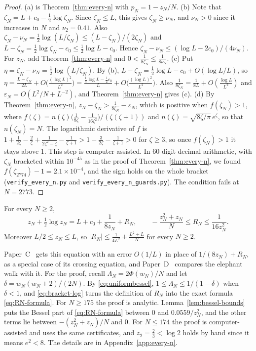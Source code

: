 \begin{proof}
(a) is Theorem~\ref{thm:every-n} with $p_N=1-z_N/N$. (b) Note that
$\zeta_N=L+c_0-\frac12\log\zeta_N$. Since $\zeta_N\le L$, this gives $\zeta_N\ge\nu_N$, and
$\nu_N>0$ since it increases in $N$ and $\nu_2=0.41$. Also $\zeta_N-\nu_N=\frac12\log(L/\zeta_N)\le(L-\zeta_N)/(2\zeta_N)$ and
$L-\zeta_N=\frac12\log\zeta_N-c_0\le\frac12\log L-c_0$. Hence
$\zeta_N-\nu_N\le(\log L-2c_0)/(4\nu_N)$. For $z_N$, add Theorem~\ref{thm:every-n} and
$0<\frac1{8\zeta_N}\le\frac1{8\nu_N}$. (c) Put $\eta=\zeta_N-\nu_N=\frac12\log(L/\zeta_N)$. By (b),
$L-\zeta_N=\frac12\log L-c_0+O(\log L/L)$, so
$\eta=\frac{L-\zeta_N}{2L}+O\bigl(\frac{(\log L)^2}{L^2}\bigr)
=\frac{\frac14\log L-\frac12c_0}L+O\bigl(\frac{(\log L)^2}{L^2}\bigr)$.
Also $\frac1{8\zeta_N}=\frac1{8L}+O(\frac{\log L}{L^2})$ and $\varepsilon_N=O(L^2/N+L^{-2})$, and
Theorem~\ref{thm:every-n} gives (c). (d) By Theorem~\ref{thm:every-n},
$z_N-\zeta_N>\frac1{8\zeta_N}-\varepsilon_N$, which is positive when $f(\zeta_N)>1$, where
$f(\zeta)=n(\zeta)\bigl(\frac1{8\zeta}-\frac1{16\zeta^2}\bigr)/(\zeta(\zeta+1))$ and
$n(\zeta)=\sqrt{8\zeta/\pi}\,e^\zeta$, so that $n(\zeta_N)=N$. The logarithmic derivative of $f$ is
$1+\frac1{2\zeta}-\frac2\zeta+\frac1{2\zeta^2-\zeta}-\frac1{\zeta+1}>1-\frac3{2\zeta}-\frac1{\zeta+1}>0$
for $\zeta\ge3$, so once $f(\zeta_N)>1$ it stays above $1$. This step is computer-assisted. In
60-digit decimal arithmetic, with $\zeta_N$ bracketed within $10^{-45}$ as in the proof of
Theorem~\ref{thm:every-n}, we found $f(\zeta_{2774})-1=2.1\times10^{-4}$, and the sign holds on
the whole bracket (\texttt{verify\_every\_n.py} and \texttt{verify\_every\_n\_guards.py}). The
condition fails at $N=2773$.
\end{proof}

\begin{proposition}\label{prop:crossing-eq}
For every $N\ge2$,
\begin{equation}\label{eq:crossing-eq}
z_N+\tfrac12\log z_N=L+c_0+\frac1{8z_N}+R_N,\qquad
-\frac{z_N^2+z_N}N\le R_N\le\frac1{16z_N^2}.
\end{equation}
Moreover $L/2\le z_N\le L$, so $|R_N|\le\frac1{4L^2}+\frac{L^2+L}N$ for every $N\ge2$.
\end{proposition}

Paper~C~\cite{paperC} gets this equation with an error $O(1/L)$ in place of $1/(8z_N)+R_N$, as a
special case of its crossing equation, and Paper~D~\cite{paperD} compares the elephant walk with
it. For the proof, recall $\Lambda_N=2\Phi(w_N)/N$ and let $\delta=w_N(w_N+2)/(2N)$. By
\eqref{eq:uniformbessel}, $1\le\Lambda_N\le1/(1-\delta)$ when $\delta<1$,
and \eqref{eq:bracket-log} turns the definition of $R_N$ into the exact formula
\eqref{eq:RN-formula}. For $N\ge175$ the proof is analytic. Lemma~\ref{lem:bessel-bounds} puts the
Bessel part of \eqref{eq:RN-formula} between $0$ and $0.0559/z_N^2$, and the other terms lie
between $-(z_N^2+z_N)/N$ and $0$. For $N\le174$ the proof is computer-assisted and uses the same
certificates, and
$z_2=\frac23<\log2$ holds by hand since it means $e^2<8$. The details are in
Appendix~\ref{app:every-n}.

